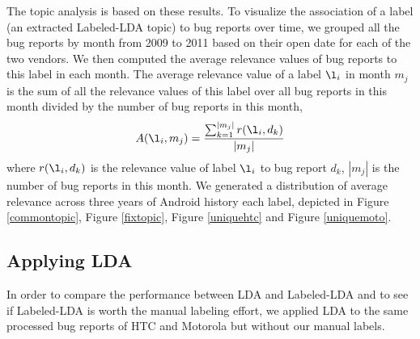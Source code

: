 \documentclass[10pt, conference, compsocconf]{IEEEtran}
\begin{document}
The topic analysis is based on these results. 
To visualize the association of a label (an extracted
Labeled-LDA topic) to bug reports over time,
we grouped
all the bug reports by month from 2009 to 2011 based on their open
date for each of the two vendors. 
We then computed the average relevance values of bug
reports to this label in each month. 
The average relevance value of a label \begin{math} \l_i \end{math} in
month \begin{math} m_j \end{math} is the sum of all the relevance
values of this label over all bug reports in this month divided by the
number of bug reports in this month,
\begin{equation}
A(\l_i,m_j) = \frac{\sum_{\substack{k=1}}^{|m_j|}r(\l_i,d_k)}{|m_j|}
\label{equation1}
\end{equation}
where $r(\l_i,d_k)$ is the relevance value of label $\l_i$ to bug
report $d_k$, $|m_j|$ is the number of bug reports in this month. 
We generated a distribution of average relevance across three years of
Android history
each label, depicted in Figure \ref{commontopic}, Figure \ref{fixtopic},
Figure \ref{uniquehtc} and Figure \ref{uniquemoto}.



\subsection{Applying LDA}




In order to compare the performance between LDA and Labeled-LDA and
 to see if Labeled-LDA is worth the manual labeling effort, 
we applied LDA to the same processed bug reports of HTC and Motorola
but without our manual labels. 
\end{document}
